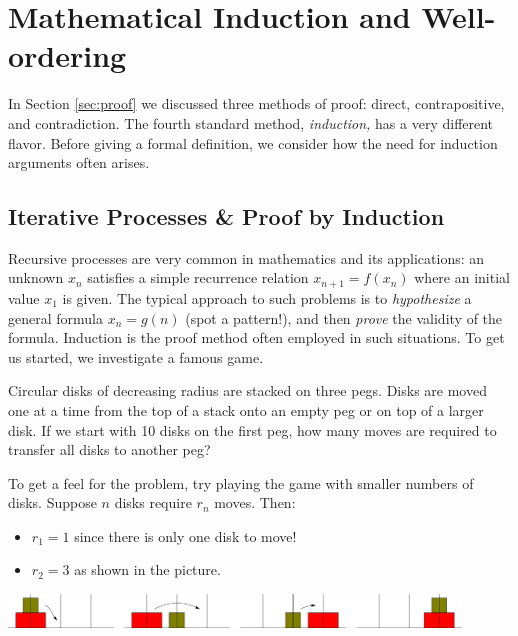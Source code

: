 \graphicspath{{5induction/asy/}}
\section{Mathematical Induction and Well-ordering}\label{chap:induction}

In Section \ref{sec:proof} we discussed three methods of proof: direct, contrapositive, and contradiction. The fourth standard method, \emph{induction,} has a very different flavor. Before giving a formal definition, we consider how the need for induction arguments often arises.

\subsection{Iterative Processes \& Proof by Induction}\label{sec:induction}

Recursive processes are very common in mathematics and its applications: an unknown $x_n$ satisfies a simple recurrence relation $x_{n+1}=f(x_n)$ where an initial value $x_1$ is given. The typical approach to such problems is to \emph{hypothesize} a general formula $x_n=g(n)$ (spot a pattern!), and then \emph{prove} the validity of the formula. Induction is the proof method often employed in such situations. To get us started, we investigate a famous game.



Circular disks of decreasing radius are stacked on three pegs. Disks are moved one at a time from the top of a stack onto an empty peg or on top of a larger disk. If we start with 10 disks on the first peg, how many moves are required to transfer all disks to another peg?\smallbreak

To get a feel for the problem, try playing the game with smaller numbers of disks. Suppose $n$ disks require $r_n$ moves. Then:
\begin{itemize}\itemsep0pt
  \item $r_1=1$ since there is only one disk to move!
  \item $r_2=3$ as shown in the picture.
\end{itemize} 

\begin{center}
	\includegraphics[width=0.9\textwidth]{induction-03-hanoi2}
\end{center}

